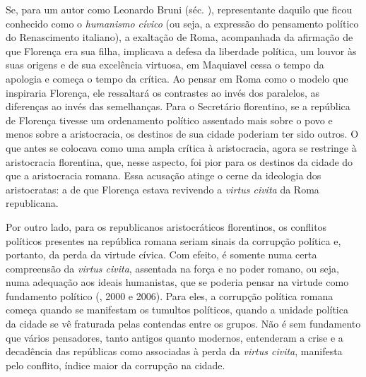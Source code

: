 Se, para um autor como Leonardo Bruni (séc. ), representante daquilo
que ficou conhecido como o \emph{humanismo cívico} (ou seja, a expressão
do pensamento político do Renascimento italiano), a exaltação de Roma,
acompanhada da afirmação de que Florença era sua filha, implicava a
defesa da liberdade política, um louvor às suas origens e de sua
excelência virtuosa, em Maquiavel cessa o tempo da apologia e começa o
tempo da crítica. Ao pensar em Roma como o modelo que inspiraria
Florença, ele ressaltará os contrastes ao invés dos paralelos, as
diferenças ao invés das semelhanças. Para o Secretário florentino, se a
república de Florença tivesse um ordenamento político assentado mais
sobre o povo e menos sobre a aristocracia, os destinos de sua cidade
poderiam ter sido outros. O que antes se colocava como uma ampla crítica
à aristocracia, agora se restringe à aristocracia florentina, que, nesse
aspecto, foi pior para os destinos da cidade do que a aristocracia
romana. Essa acusação atinge o cerne da ideologia dos aristocratas: a de
que Florença estava revivendo a \emph{virtus civita} da Roma
republicana.

Por outro lado, para os republicanos aristocráticos florentinos, os
conflitos políticos presentes na república romana seriam sinais da
corrupção política e, portanto, da perda da virtude cívica. Com efeito,
é somente numa certa compreensão da \emph{virtus civita}, assentada na
força e no poder romano, ou seja, numa adequação aos ideais humanistas,
que se poderia pensar na virtude como fundamento político (, 2000
e 2006). Para eles, a corrupção política romana começa quando se
manifestam os tumultos políticos, quando a unidade política da cidade se
vê fraturada pelas contendas entre os grupos. Não é sem fundamento que
vários pensadores, tanto antigos quanto modernos, entenderam a crise e a
decadência das repúblicas como associadas à perda da \emph{virtus
civita}, manifesta pelo conflito, índice maior da corrupção na cidade.

